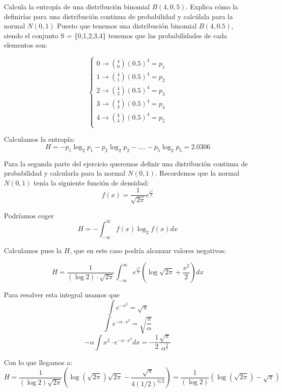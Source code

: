 \begin{problem}[4]
	Calcula la entropía de una distribución binomial $B(4,0,5)$. Explica cómo la definirías para una distribución continua de probabilidad y calcúlala para la normal $N(0,1)$
	\solution
	Puesto que tenemos una distribución binomial $B (4, 0.5)$, siendo el conjunto S = \{0,1,2,3,4\} tenemos que las probabilidades de cada elementos son:

	\[\begin{cases}
	0 \rightarrow {4 \choose 0} (0.5)^4 = p_1 \\
	1 \rightarrow {4 \choose 1} (0.5)^4 = p_2 \\
	2 \rightarrow {4 \choose 2} (0.5)^4 = p_3 \\
	3 \rightarrow {4 \choose 3} (0.5)^4 = p_4 \\
	4 \rightarrow {4 \choose 4} (0.5)^4 = p_5 \\
	\end{cases}\]

	Calculamos la entropía:
	$$H = -p_1 \log_2 p_1 -p_2 \log_2 p_2 - ....  -p_5 \log_2 p_5 = 2.0306 $$

	Para la segunda parte del ejercicio queremos definir una distribución continua de probabilidad y calcularla para la normal $N(0,1)$. Recordemos que la normal $N(0,1)$ tenía la siguiente función de densidad:
	$$f(x) = \frac{1}{\sqrt{2\pi}} e^{\frac{x^2}{2}}$$

	Podríamos coger
	$$H = -\int_{-\infty}^{\infty} f(x) \log_2 f(x) dx$$

	Calculamos pues la $H$, que en este caso podría alcanzar valores negativos:

	$$H = \frac{1}{(\log 2) \cdot \sqrt{2\pi}} \int_{-\infty}^{\infty} e^{\frac{x^2}{2}} \left(\log \sqrt{2\pi} + \frac{x^2}{2}\right) dx$$

	Para resolver esta integral usamos que
	$$\int e^{-x^2} = \sqrt{\pi}$$
	$$\int e^{-\alpha \cdot x^2} = \sqrt{\frac{\pi}{\alpha}}$$
	$$- \alpha\int x^2\cdot  e^{-\alpha \cdot x^2} dx = -\frac{1}{2}\frac{\sqrt{\pi}}{\alpha^{\frac{3}{2}}}$$

	Con lo que llegamos a:
	\[H = \frac{1}{(\log 2)\sqrt{2π}}\left(\log(\sqrt{2π})\sqrt{2π} -\frac{\sqrt{π}}{4(1/2)^{3/2}}\right)=\frac{1}{(\log 2)}\left(\log(\sqrt{2π}) -\sqrt{π}\right)\]
\end{problem}

